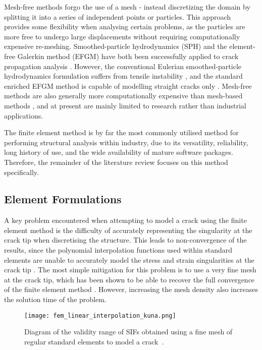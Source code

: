 Mesh-free methods forgo the use of a mesh - instead discretizing the domain by splitting it into a series of independent points or particles. This approach provides some flexibility when analysing certain problems, as the particles are more free to undergo large displacements without requiring computationally expensive re-meshing. Smoothed-particle hydrodynamics (SPH) and the element-free Galerkin method (EFGM) have both been successfully applied to crack propagation analysis \cite{mu_improved_2023} \cite{belytschko_crack_1995}. However, the conventional Eulerian smoothed-particle hydrodynamics formulation suffers from tensile instability \cite{islam_total_2019}, and the standard enriched EFGM method is capable of modelling straight cracks only \cite{pant_novel_2013}. Mesh-free methods are also generally more computationally expensive than mesh-based methods \cite{liu_chapter_2014}, and at present are mainly limited to research rather than industrial applications.

The finite element method is by far the most commonly utilised method for performing structural analysis within industry, due to its versatility, reliability, long history of use, and the wide availability of mature software packages.  Therefore, the remainder of the literature review focuses on this method specifically.

\subsection{Element Formulations}

A key problem encountered when attempting to model a crack using the finite element method is the difficulty of accurately representing the singularity at the crack tip when discretising the structure. This leads to non-convergence of the results, since the polynomial interpolation functions used within standard elements are unable to accurately model the stress and strain singularities at the crack tip \cite{murti_universal_1986}. The most simple mitigation for this problem is to use a very fine mesh at the crack tip, which has been shown to be able to recover the full convergence of the finite element method \cite{fried_best_1972}.  However, increasing the mesh density also increases the solution time of the problem.

\begin{figure}[H]
	\centering
	\texttt{[image: fem\_linear\_interpolation\_kuna.png]}
	\caption{Diagram of the validity range of SIFs obtained using a fine mesh of regular standard elements to model a crack\ \cite{kuna_finite_2013}.}
	\label{fig:fem_linear_interpolation_kuna}
\end{figure}

